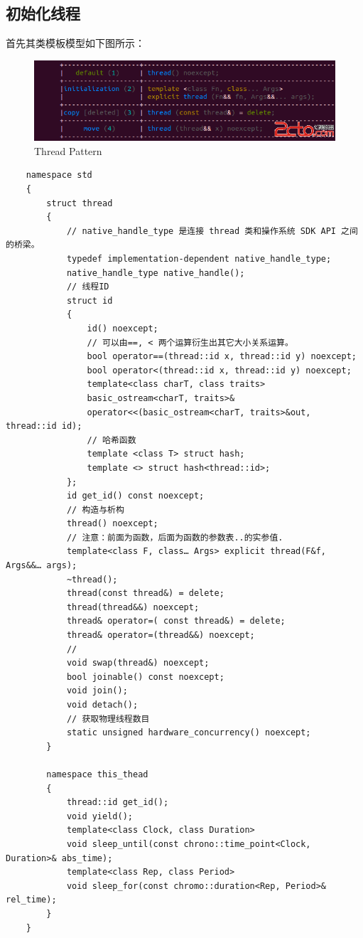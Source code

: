 \documentclass[UTF8,a4paper,12pt]{ctexbook}
\begin{document}
		\subsection{初始化线程}
		首先其类模板模型如下图所示：
		\begin{figure}[h]
			\centering
			\includegraphics[scale= 0.8]{thread.png}
			\caption{Thread Pattern}
		\end{figure}
		\begin{lstlisting}
	namespace std
	{
		struct thread
		{
			// native_handle_type 是连接 thread 类和操作系统 SDK API 之间的桥梁。
			typedef implementation-dependent native_handle_type;
			native_handle_type native_handle();
			// 线程ID
			struct id
			{
				id() noexcept;
				// 可以由==, < 两个运算衍生出其它大小关系运算。
				bool operator==(thread::id x, thread::id y) noexcept;
				bool operator<(thread::id x, thread::id y) noexcept;
				template<class charT, class traits>
				basic_ostream<charT, traits>&
				operator<<(basic_ostream<charT, traits>&out, thread::id id);
				// 哈希函数
				template <class T> struct hash;
				template <> struct hash<thread::id>;
			};
			id get_id() const noexcept;
			// 构造与析构
			thread() noexcept;
			// 注意：前面为函数，后面为函数的参数表..的实参值.
			template<class F, class… Args> explicit thread(F&f, Args&&… args);
			~thread();
			thread(const thread&) = delete;
			thread(thread&&) noexcept;
			thread& operator=( const thread&) = delete;
			thread& operator=(thread&&) noexcept;
			//
			void swap(thread&) noexcept;
			bool joinable() const noexcept;
			void join();
			void detach();
			// 获取物理线程数目
			static unsigned hardware_concurrency() noexcept;
		}
		
		namespace this_thead
		{
			thread::id get_id();
			void yield();
			template<class Clock, class Duration>
			void sleep_until(const chrono::time_point<Clock, Duration>& abs_time);
			template<class Rep, class Period>
			void sleep_for(const chromo::duration<Rep, Period>& rel_time);
		}
	}	
		\end{lstlisting}
		
\end{document}
